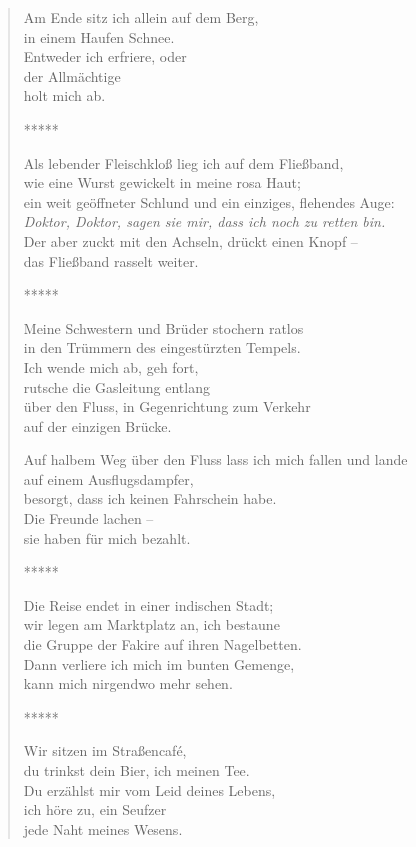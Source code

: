 
\cleartorecto


\begin{verse}
Am Ende sitz ich allein auf dem Berg,\\
in einem Haufen Schnee.\\
Entweder ich erfriere, oder\\
der Allmächtige\\
holt mich ab.

*****

Als lebender Fleischkloß lieg ich auf dem Fließband,\\
wie eine Wurst gewickelt in meine rosa Haut;\\
ein weit geöffneter Schlund und ein einziges, flehendes Auge:\\
\emph{Doktor, Doktor, sagen sie mir, dass ich noch zu retten bin.}\\
Der aber zuckt mit den Achseln, drückt einen Knopf --\\
das Fließband rasselt weiter.

*****

Meine Schwestern und Brüder stochern ratlos\\
in den Trümmern des eingestürzten Tempels.\\
Ich wende mich ab, geh fort,\\
rutsche die Gasleitung entlang\\
über den Fluss, in Gegenrichtung zum Verkehr\\
auf der einzigen Brücke.

Auf halbem Weg über den Fluss lass ich mich fallen und lande\\
auf einem Ausflugsdampfer,\\
besorgt, dass ich keinen Fahrschein habe.\\
Die Freunde lachen --\\
sie haben für mich bezahlt.

*****

Die Reise endet in einer indischen Stadt;\\
wir legen am Marktplatz an, ich bestaune\\
die Gruppe der Fakire auf ihren Nagelbetten.\\
Dann verliere ich mich im bunten Gemenge,\\
kann mich nirgendwo mehr sehen.

*****

Wir sitzen im Straßencafé,\\
du trinkst dein Bier, ich meinen Tee.\\
Du erzählst mir vom Leid deines Lebens,\\
ich höre zu, ein Seufzer\\
jede Naht meines Wesens.


\end{verse}
